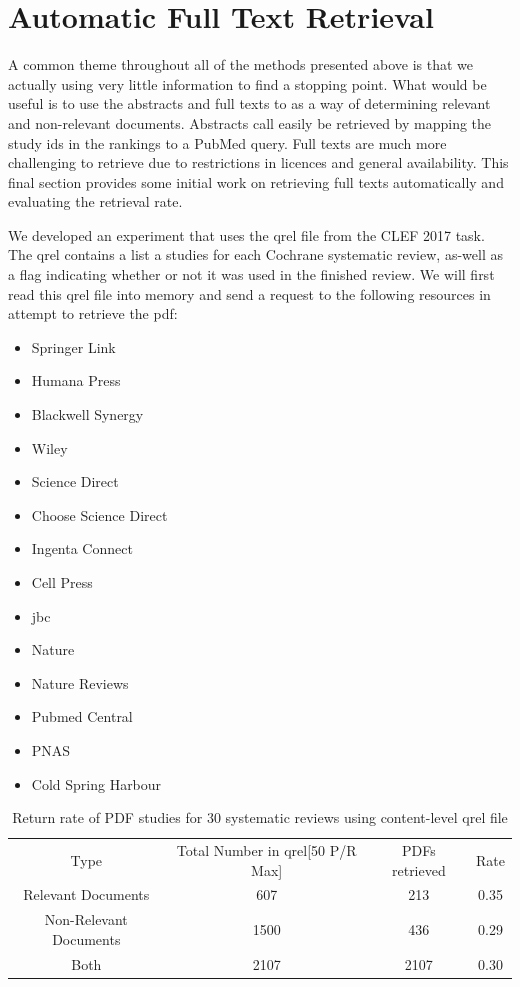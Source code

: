 \section{Automatic Full Text Retrieval} \label{automatic_f_t_r}


A common theme throughout all of the methods presented above is that we actually using very little information to find a stopping point. What would be useful is to use the abstracts and full texts to as a way of determining relevant and non-relevant documents. Abstracts call easily be retrieved by mapping the study ids in the rankings to a PubMed query. Full texts are much more challenging to retrieve due to restrictions in licences and general availability. This final section provides some initial work on retrieving full texts automatically and evaluating the retrieval rate.

We developed an experiment that uses the qrel file from the CLEF 2017 task. The qrel contains a list a studies for each Cochrane systematic review, as-well as a flag indicating whether or not it was used in the finished review. We will first read this qrel file into memory and send a request to the following resources in attempt to retrieve the pdf:

\begin{itemize}
\item Springer Link
\item Humana Press
\item Blackwell Synergy
\item Wiley
\item Science Direct
\item Choose Science Direct
\item Ingenta Connect
\item Cell Press
\item jbc
\item Nature
\item Nature Reviews
\item Pubmed Central
\item PNAS
\item Cold Spring Harbour

\end{itemize}

\begin{table}[H]

\centering
\begin{tabular}{|c|c|c|c|} 
\hline
 Type & Total Number in qrel[50 P/R Max] & PDFs retrieved & Rate  \\ 
 Relevant Documents & 607 &		213 & 0.35 \\ 
 Non-Relevant Documents & 1500 &		436 & 0.29 \\ 
 Both & 2107  &		2107 & 0.30 \\ 

 \hline
\end{tabular}

\caption{Return rate of PDF studies for 30 systematic reviews using content-level qrel file}

\end{table}

